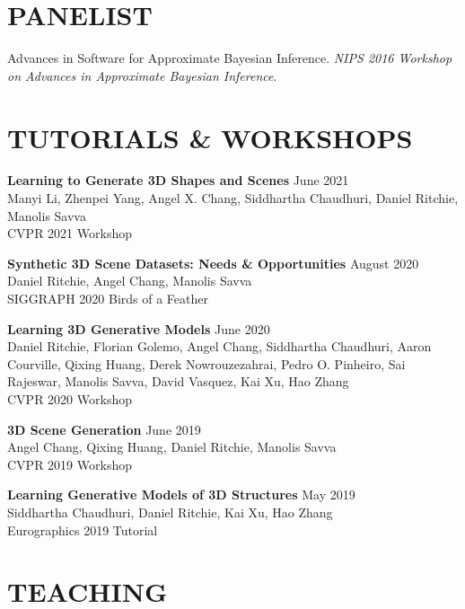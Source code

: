 \documentclass[line,margin]{res}
\begin{document}
\begin{resume}
\section{PANELIST}

\newcommand{\panelist}[2]{
	#1. \emph{#2}.
}

\panelist{Advances in Software for Approximate Bayesian Inference}{NIPS 2016 Workshop on Advances in Approximate Bayesian Inference}


\section{TUTORIALS \& WORKSHOPS}

\newcommand{\tutorial}[4] {
	\textbf{#1} \hfill #4\\
	#2\\
	#3
}
\newcommand{\workshop}[4] {
	\textbf{#1} \hfill #4\\
	#2\\
	#3
}

\workshop
{Learning to Generate 3D Shapes and Scenes}
{Manyi Li, Zhenpei Yang, Angel X. Chang, Siddhartha Chaudhuri, Daniel Ritchie, Manolis Savva}
{CVPR 2021 Workshop}
{June 2021}

\workshop
{Synthetic 3D Scene Datasets: Needs \& Opportunities}
{Daniel Ritchie, Angel Chang, Manolis Savva}
{SIGGRAPH 2020 Birds of a Feather}
{August 2020}

\workshop
{Learning 3D Generative Models}
{Daniel Ritchie, Florian Golemo, Angel Chang, Siddhartha Chaudhuri, Aaron Courville, Qixing Huang, Derek Nowrouzezahrai, Pedro O. Pinheiro, Sai Rajeswar, Manolis Savva, David Vasquez, Kai Xu, Hao Zhang}
{CVPR 2020 Workshop}
{June 2020}

\workshop
{3D Scene Generation}
{Angel Chang, Qixing Huang, Daniel Ritchie, Manolis Savva}
{CVPR 2019 Workshop}
{June 2019}

\tutorial
{Learning Generative Models of 3D Structures}
{Siddhartha Chaudhuri, Daniel Ritchie, Kai Xu, Hao Zhang}
{Eurographics 2019 Tutorial}
{May 2019}


\section{TEACHING}

\newcommand{\teach}[3] {
	\textbf{#1} \hfill #3\\
	#2
}


\end{resume}
\end{document}
